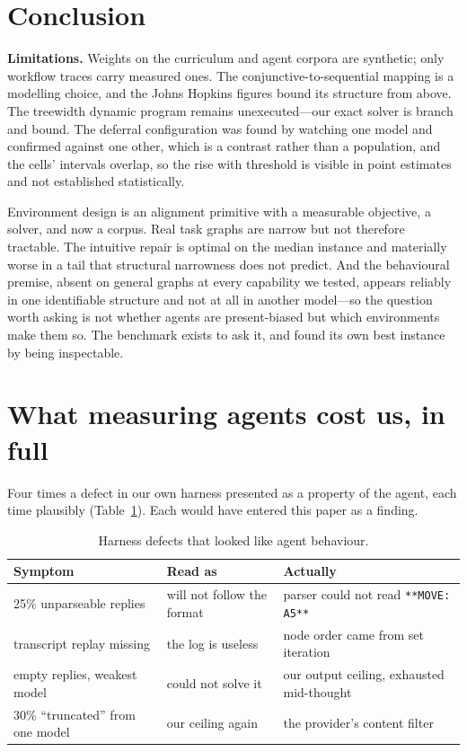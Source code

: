 \documentclass[10pt]{article}
\begin{document}
\section{Conclusion}

\textbf{Limitations.} Weights on the curriculum and agent corpora are synthetic;
only workflow traces carry measured ones. The conjunctive-to-sequential mapping is a
modelling choice, and the Johns Hopkins figures bound its structure from above. The
treewidth dynamic program remains unexecuted---our exact solver is branch and bound.
The deferral configuration was found by watching one model and confirmed against one
other, which is a contrast rather than a population, and the cells' intervals overlap,
so the rise with threshold is visible in point estimates and not established
statistically.

Environment design is an alignment primitive with a measurable objective, a solver,
and now a corpus. Real task graphs are narrow but not therefore tractable. The
intuitive repair is optimal on the median instance and materially worse in a tail
that structural narrowness does not predict. And the behavioural premise, absent on
general graphs at every capability we tested, appears reliably in one identifiable
structure and not at all in another model---so the question worth asking is not
whether agents are present-biased but which environments make them so. The benchmark
exists to ask it, and found its own best instance by being inspectable.


\appendix

\section{What measuring agents cost us, in full}
\label{app:cost}

Four times a defect in our own harness presented as a property of the agent, each
time plausibly (Table~\ref{tab:defects}). Each would have entered this paper as a
finding.

\begin{table}[H]
\centering
\small
\begin{tabular}{lll}
\toprule
Symptom & Read as & Actually \\
\midrule
25\% unparseable replies       & will not follow the format & parser could not read \verb|**MOVE: A5**| \\
transcript replay missing      & the log is useless         & node order came from set iteration \\
empty replies, weakest model   & could not solve it         & our output ceiling, exhausted mid-thought \\
30\% ``truncated'' from one model & our ceiling again       & the provider's content filter \\
\bottomrule
\end{tabular}
\caption{Harness defects that looked like agent behaviour.}
\label{tab:defects}
\end{table}
\end{document}
